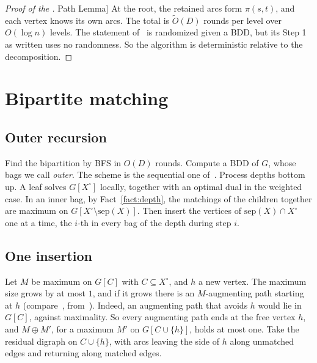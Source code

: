 \documentclass[11pt]{article}
\theoremstyle{definition}
\theoremstyle{remark}
\theoremstyle{plain}
\newcommand{\LemPath}{\hyperref[lem:path]{Path Lemma}}
\newcommand{\Ot}{\tilde O}
\newcommand{\sep}{\mathrm{sep}}
\begin{document}
\begin{proof}[Proof of the \LemPath{}]
At the root, the retained arcs form $\pi(s,t)$, and each vertex knows its own arcs. The total is $\Ot(D)$ rounds per
level over $O(\log n)$ levels. The statement of~\cite[Lemma 16]{P20} is randomized given a BDD, but its Step 1 as written uses no
randomness. So the algorithm is deterministic relative to the decomposition.
\end{proof}

\section{Bipartite matching}\label{sec:bip}

\subsection{Outer recursion}

Find the bipartition by BFS in $O(D)$ rounds. Compute a BDD of $G$, whose bags we call \emph{outer}. The scheme is the
sequential one of~\cite{LT80}. Process depths bottom up. A leaf solves $G[X^\circ]$ locally, together with an optimal
dual in the weighted case. In an inner bag, by Fact~\ref{fact:depth}, the matchings of the children together are maximum on $G[X^\circ\setminus\sep(X)]$.
Then insert the vertices of $\sep(X)\cap X^\circ$ one at a time, the $i$-th in every bag of the depth during step $i$.

\subsection{One insertion}

Let $M$ be maximum on $G[C]$ with $C\subseteq X^\circ$, and $h$ a new vertex. The maximum size grows by at most $1$, and
if it grows there is an $M$-augmenting path starting at $h$ (compare~\cite[Proposition 1]{IKNS22}, from~\cite{IOO18}).
Indeed, an augmenting path that avoids $h$ would lie in $G[C]$, against maximality. So every augmenting path ends at the free vertex
$h$, and $M\oplus M'$, for a maximum $M'$ on $G[C\cup\{h\}]$, holds at most one. Take the residual digraph on $C\cup\{h\}$,
with arcs leaving the side of $h$ along unmatched edges and returning along matched edges.
\end{document}
